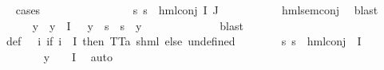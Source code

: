 \begin{isabellebody}
\ \ \ \ \isamarkupfalse%
{\isacharparenleft}{\kern0pt}cases{\isacharparenright}{\kern0pt}\isanewline
\ \ \ \ \ \ \isamarkupfalse%
\ {}\isanewline
\ \ \ \ \ \ \isamarkupfalse%
\ {\isachardoublequoteopen}{\isasymforall}s{\isachardot}{\kern0pt}\ {\isasymnot}s\ {\isasymTurnstile}\ {\isacharparenleft}{\kern0pt}hml{\isacharunderscore}{\kern0pt}conj\ I\ J\ {\isasymPhi}{\isacharparenright}{\kern0pt}{\isachardoublequoteclose}\isanewline
\ \ \ \ \ \ \ \ \isamarkupfalse%
\ hml{\isacharunderscore}{\kern0pt}sem{\isacharunderscore}{\kern0pt}conj\ \isamarkupfalse%
\ blast\isanewline
\ \ \ \ \ \ \isamarkupfalse%
\ y\ \ {\isachardoublequoteopen}y\ {\isasymin}\ {\isasymPhi}{\isacharbackquote}{\kern0pt}I{\isachardoublequoteclose}\ {\isachardoublequoteopen}{\isasymphi}\ {\isasymnoteq}\ y\ {\isasymand}\ {\isacharparenleft}{\kern0pt}{\isasymforall}s{\isachardot}{\kern0pt}\ {\isasymnot}\ s\ {\isasymTurnstile}\ y{\isacharparenright}{\kern0pt}{\isachardoublequoteclose}\ \isanewline
\ \ \ \ \ \ \ \ \isamarkupfalse%
\ {\isachardoublequoteopen}{}{\isachardoublequoteclose}\ \isamarkupfalse%
\ blast\isanewline
\ \ \ \ \ \ \isamarkupfalse%
\ {\isasymPsi}\ \ {\isasymPsi}{\isacharunderscore}{\kern0pt}def{\isacharcolon}{\kern0pt}\ {\isachardoublequoteopen}{\isasymPsi}\ {\isacharequal}{\kern0pt}\ {\isacharparenleft}{\kern0pt}{\isasymlambda}i{\isachardot}{\kern0pt}\ {\isacharparenleft}{\kern0pt}if\ i\ {\isasymin}\ I\ then\ {\isacharparenleft}{\kern0pt}TT{\isacharcolon}{\kern0pt}{\isacharcolon}{\kern0pt}{\isacharparenleft}{\kern0pt}{\isacharprime}{\kern0pt}a{\isacharcomma}{\kern0pt}\ {\isacharprime}{\kern0pt}s{\isacharparenright}{\kern0pt}hml{\isacharparenright}{\kern0pt}\ else\ undefined{\isacharparenright}{\kern0pt}{\isacharparenright}{\kern0pt}{\isachardoublequoteclose}\isanewline
\ \ \ \ \ \ \isamarkupfalse%
\ {\isachardoublequoteopen}{\isasymforall}s{\isachardot}{\kern0pt}\ {\isasymnot}s\ {\isasymTurnstile}\ {\isacharparenleft}{\kern0pt}hml{\isacharunderscore}{\kern0pt}conj\ {\isacharbraceleft}{\kern0pt}{\isacharbraceright}{\kern0pt}\ I\ {\isasymPsi}{\isacharparenright}{\kern0pt}{\isachardoublequoteclose}\ \isanewline
\ \ \ \ \ \ \ \ \isamarkupfalse%
\ {\isacartoucheopen}y\ {\isasymin}\ {\isasymPhi}\ {\isacharbackquote}{\kern0pt}\ I{\isacartoucheclose}\ \isamarkupfalse%
\ auto\isanewline
\ \ \ \ \ \ \isamarkupfalse%

\end{isabellebody}
